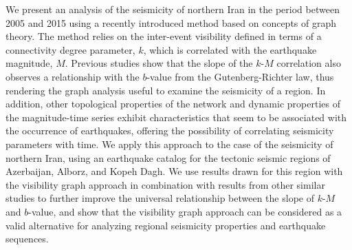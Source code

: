 %
We present an analysis of the seismicity of northern Iran in the period between 2005 and 2015 using a recently introduced method based on concepts of graph theory. The method relies on the inter-event visibility defined in terms of a connectivity degree parameter, $k$, which is correlated with the earthquake magnitude, $M$. Previous studies show that the slope of the $k$-$M$ correlation also observes a relationship with the $b$-value from the Gutenberg-Richter law, thus rendering the graph analysis useful to examine the seismicity of a region. In addition, other topological properties of the network and dynamic properties of the magnitude-time series exhibit characteristics that seem to be associated with the occurrence of earthquakes, offering the possibility of correlating seismicity parameters with time. We apply this approach to the case of the seismicity of northern Iran, using an earthquake catalog for the tectonic seismic regions of Azerbaijan, Alborz, and Kopeh Dagh. We use results drawn for this region with the visibility graph approach in combination with results from other similar studies to further improve the universal relationship between the slope of $k$-$M$ and $b$-value, and show that the visibility graph approach can be considered as a valid alternative for analyzing regional seismicity properties and earthquake sequences.
